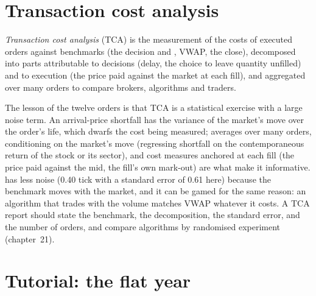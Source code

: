 \section{Transaction cost analysis}

\begin{definition}\label{def:rs:measuring-market-making-and-execution:tca}
\emph{Transaction cost analysis} (TCA) is the measurement of the costs of executed orders against benchmarks (the decision and
, VWAP, the close), decomposed into parts attributable to decisions (delay, the choice to leave quantity unfilled) and to execution (the price paid
against the market at each fill), and aggregated over many orders to compare brokers, algorithms and traders.
\end{definition}

The lesson of the twelve orders is that TCA is a statistical exercise with a large noise term. An arrival-price shortfall has the variance of the market's move
over the order's life, which dwarfs the cost being measured; averages over many orders, conditioning on the market's move (regressing shortfall on the
contemporaneous return of the stock or its sector), and cost measures anchored at each fill (the price paid against the mid, the fill's own mark-out) are what
make it informative.  has less noise (0.40 tick with a standard error of 0.61 here) because the benchmark moves with the market, and it can be gamed
for the same reason: an algorithm that trades with the volume matches VWAP whatever it costs. A TCA report should state the benchmark, the decomposition, the
standard error, and the number of orders, and compare algorithms by randomised experiment (chapter~21).

\section{Tutorial: the flat year}\label{tut:rs:measuring-market-making-and-execution:tut}


